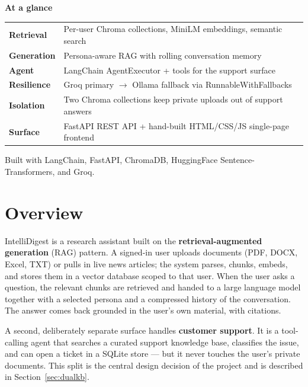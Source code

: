 \documentclass[11pt]{article}
\newcommand{\code}[1]{{\ttfamily\small #1}}
\newcommand{\kw}[1]{\textcolor{accent}{\sffamily\bfseries #1}}
\begin{document}
\noindent\begin{tcolorbox}[enhanced,colback=white,colframe=line,boxrule=0.7pt,arc=4pt,
  left=10pt,right=10pt,top=9pt,bottom=9pt]
{\sffamily\bfseries\color{ink}At a glance}\\[3pt]
\footnotesize\color{subink}
\begin{tabularx}{\linewidth}{@{}p{26mm}L@{}}
\kw{Retrieval} & Per-user Chroma collections, MiniLM embeddings, semantic search \\
\kw{Generation} & Persona-aware RAG with rolling conversation memory \\
\kw{Agent} & LangChain \code{AgentExecutor} + tools for the support surface \\
\kw{Resilience} & Groq primary $\rightarrow$ Ollama fallback via \code{RunnableWithFallbacks} \\
\kw{Isolation} & Two Chroma collections keep private uploads out of support answers \\
\kw{Surface} & FastAPI REST API + hand-built HTML/CSS/JS single-page frontend \\
\end{tabularx}
\end{tcolorbox}

\vfill
{\footnotesize\color{slate}\sffamily Built with LangChain, FastAPI, ChromaDB, HuggingFace Sentence-Transformers, and Groq.}

\clearpage

\section{Overview}
\label{sec:overview}

IntelliDigest is a research assistant built on the \kw{retrieval-augmented
generation} (RAG) pattern. A signed-in user uploads documents (PDF, DOCX, Excel,
TXT) or pulls in live news articles; the system parses, chunks, embeds, and stores
them in a vector database scoped to that user. When the user asks a question, the
relevant chunks are retrieved and handed to a large language model together with a
selected persona and a compressed history of the conversation. The answer comes
back grounded in the user's own material, with citations.

A second, deliberately separate surface handles \kw{customer support}. It is a
tool-calling agent that searches a curated support knowledge base, classifies the
issue, and can open a ticket in a SQLite store --- but it never touches the user's
private documents. This split is the central design decision of the project and is
described in Section~\ref{sec:dualkb}.
\end{document}
